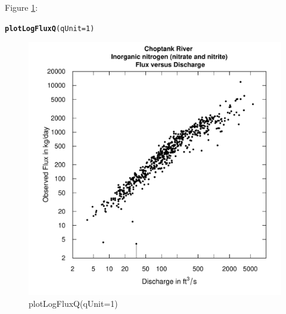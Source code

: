 \documentclass[a4paper,11pt]{article}\usepackage{graphicx, color}
\makeatletter
\newcommand{\hlfunctioncall}[1]{\textcolor[rgb]{0.501960784313725,0,0.329411764705882}{\textbf{#1}}}%
\newenvironment{kframe}{%
 \def\at@end@of@kframe{}%
 \ifinner\ifhmode%
  \def\at@end@of@kframe{\end{minipage}}%
  \begin{minipage}{\columnwidth}%
 \fi\fi%
 \def\FrameCommand##1{\hskip\@totalleftmargin \hskip-\fboxsep
 \colorbox{shadecolor}{##1}\hskip-\fboxsep
     \hskip-\linewidth \hskip-\@totalleftmargin \hskip\columnwidth}%
 \MakeFramed {\advance\hsize-\width
   \@totalleftmargin\z@ \linewidth\hsize
   \@setminipage}}%
 {\par\unskip\endMakeFramed%
 \at@end@of@kframe}
\newenvironment{knitrout}{}{} %
\makeatother
\begin{document}
Figure \ref{fig:plotLogConcQ}:
\begin{knitrout}
\color{fgcolor}\begin{kframe}
\begin{alltt}
\hlfunctioncall{plotLogFluxQ}(qUnit=1)
\end{alltt}
\end{kframe}\begin{figure}[]

\includegraphics[width=.5\linewidth,height=.5\linewidth]{figure/plotLogConcQ} \caption[plotLogFluxQ(qUnit=1)]{plotLogFluxQ(qUnit=1)\label{fig:plotLogConcQ}}
\end{figure}


\end{knitrout}
\end{document}
